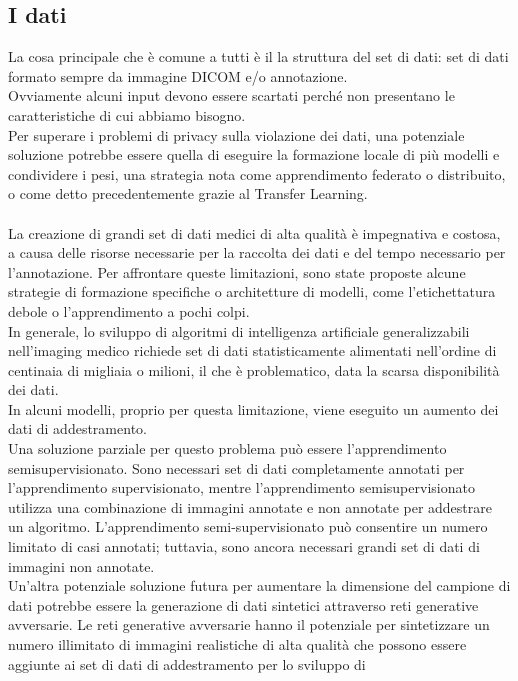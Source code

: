 \documentclass[12pt,a4paper]{report}
\begin{document}
\subsection{I dati}
La cosa principale che è comune a tutti è il la struttura del set di dati: set di dati formato sempre  da immagine DICOM e/o annotazione.\\
Ovviamente alcuni input devono essere scartati perché non presentano le caratteristiche di cui abbiamo bisogno.\\
Per superare i problemi di privacy sulla violazione dei dati, una potenziale soluzione potrebbe essere quella di eseguire la formazione locale di più modelli e condividere i pesi, una strategia nota come apprendimento federato o distribuito, o come detto precedentemente grazie al Transfer Learning.\\
\\
La creazione di grandi set di dati medici di alta qualità è impegnativa e costosa, a causa delle risorse necessarie per la raccolta dei dati e del tempo necessario per l'annotazione. Per affrontare queste limitazioni, sono state proposte alcune strategie di formazione specifiche o architetture di modelli, come l'etichettatura debole o l'apprendimento a pochi colpi.
\\
In generale, lo sviluppo di algoritmi di intelligenza artificiale generalizzabili nell'imaging medico richiede set di dati statisticamente alimentati nell'ordine di centinaia di migliaia o milioni, il che è problematico, data la scarsa disponibilità
dei dati.\\
In alcuni modelli, proprio per questa limitazione, viene eseguito un aumento dei dati di addestramento.\\
Una soluzione parziale per questo problema può essere l'apprendimento semisupervisionato. Sono necessari
set di dati completamente annotati per l'apprendimento supervisionato, mentre l'apprendimento semisupervisionato
utilizza una combinazione di immagini annotate e non annotate per addestrare un algoritmo.
L'apprendimento semi-supervisionato può consentire un numero limitato di casi annotati; tuttavia, sono ancora 
necessari grandi set di dati di immagini non annotate.\\
Un'altra potenziale soluzione futura per aumentare la dimensione del campione di dati potrebbe essere la generazione di dati 
sintetici attraverso reti generative avversarie. Le reti generative avversarie hanno il potenziale per sintetizzare un numero
illimitato di immagini realistiche di alta qualità che possono essere aggiunte ai set di dati di addestramento per lo sviluppo di 
\end{document}
